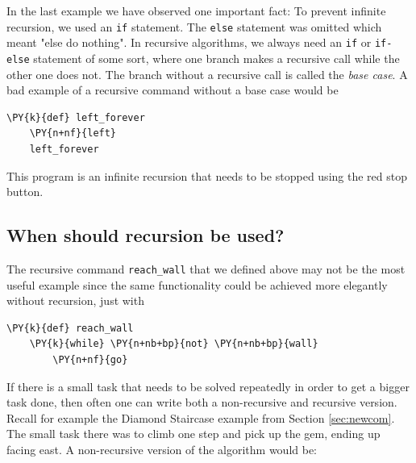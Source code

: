 In the last example we have observed one important fact: To prevent infinite recursion, we 
used an {\tt if} statement. The {\tt else} statement was omitted which meant "else do nothing".
In recursive algorithms, we always need an {\tt if} or {\tt if-else} statement of some sort, 
where one branch makes a recursive call while the other one does not. 
The branch without a recursive call is called the {\em base case}. A bad example 
of a recursive command without a base case would be\\

\begin{bbox}
\begin{Verbatim}[commandchars=\\\{\}]
\PY{k}{def} left_forever
    \PY{n+nf}{left}
    left_forever
\end{Verbatim}
\end{bbox}
\vspace{6mm}

\noindent
This program is an infinite recursion that needs to be stopped using the 
red stop button.

\subsection[\ \ When should recursion be used?]{When should recursion be used?}

The recursive command {\tt reach\_wall} that we defined above may not be the most useful example 
since the same functionality could be achieved more elegantly without recursion, just with\\

\begin{bbox}
\begin{Verbatim}[commandchars=\\\{\}]
\PY{k}{def} reach_wall
    \PY{k}{while} \PY{n+nb+bp}{not} \PY{n+nb+bp}{wall}
        \PY{n+nf}{go}
\end{Verbatim}
\end{bbox}
\vspace{6mm}

\noindent
If there is a small task that needs to be solved repeatedly in order to get a bigger task done,
then often one can write both a non-recursive and recursive version. Recall for example the Diamond
Staircase example from Section \ref{sec:newcom}. The small task there was to climb one step and pick 
up the gem, ending up facing east. A non-recursive version of the algorithm would be:\\

